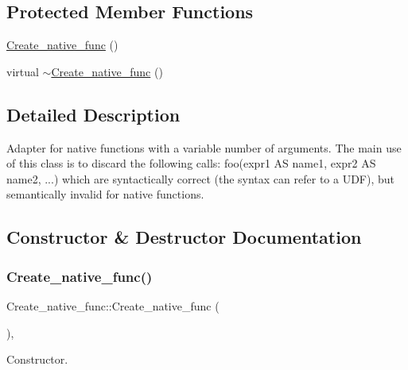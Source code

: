 \subsection*{Protected Member Functions}
\begin{DoxyCompactItemize}
\item 
\mbox{\hyperlink{classCreate__native__func_ab7c1b96607b6ddefce7c4e3abd7935d8}{Create\+\_\+native\+\_\+func}} ()
\item 
virtual \mbox{\hyperlink{classCreate__native__func_ae8d4b19b44ee25dd94d052de24ca517a}{$\sim$\+Create\+\_\+native\+\_\+func}} ()
\end{DoxyCompactItemize}


\subsection{Detailed Description}
Adapter for native functions with a variable number of arguments. The main use of this class is to discard the following calls\+: {\ttfamily foo(expr1 A\+S name1, expr2 A\+S name2, ...)} which are syntactically correct (the syntax can refer to a U\+DF), but semantically invalid for native functions. 

\subsection{Constructor \& Destructor Documentation}
\mbox{\label{classCreate__native__func_ab7c1b96607b6ddefce7c4e3abd7935d8}} 
\subsubsection{\texorpdfstring{Create\+\_\+native\+\_\+func()}{Create\_native\_func()}}
{\footnotesize\ttfamily Create\+\_\+native\+\_\+func\+::\+Create\+\_\+native\+\_\+func (\begin{DoxyParamCaption}{ }\end{DoxyParamCaption})\hspace{0.3cm}{\ttfamily [inline]}, {\ttfamily [protected]}}

Constructor. \mbox{\label{classCreate__native__func_ae8d4b19b44ee25dd94d052de24ca517a}} 
